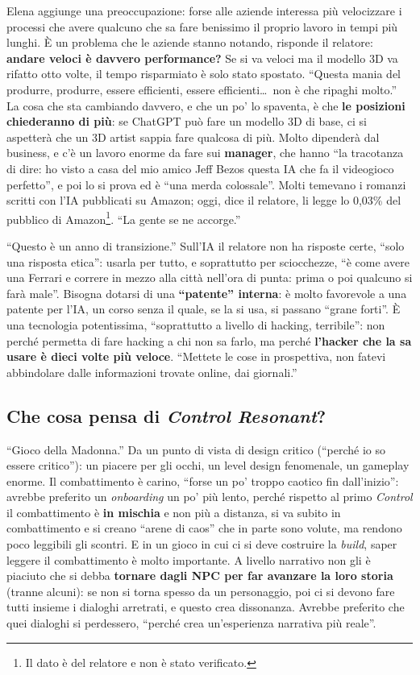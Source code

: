 Elena aggiunge una preoccupazione: forse alle aziende interessa più
velocizzare i processi che avere qualcuno che sa fare benissimo il proprio
lavoro in tempi più lunghi. È un problema che le aziende stanno notando,
risponde il relatore: \textbf{andare veloci è davvero performance?} Se si va
veloci ma il modello 3D va rifatto otto volte, il tempo risparmiato è solo
stato spostato. ``Questa mania del produrre, produrre, essere efficienti,
essere efficienti\ldots\ non è che ripaghi molto.'' La cosa che sta cambiando
davvero, e che un po' lo spaventa, è che \textbf{le posizioni chiederanno di
più}: se ChatGPT può fare un modello 3D di base, ci si aspetterà che un 3D
artist sappia fare qualcosa di più. Molto dipenderà dal business, e c'è un
lavoro enorme da fare sui \textbf{manager}, che hanno ``la tracotanza di dire:
ho visto a casa del mio amico Jeff Bezos questa IA che fa il videogioco
perfetto'', e poi lo si prova ed è ``una merda colossale''. Molti temevano i
romanzi scritti con l'IA pubblicati su Amazon; oggi, dice il relatore, li
legge lo 0,03\% del pubblico di Amazon\footnote{Il dato è del relatore e non è
stato verificato.}. ``La gente se ne accorge.''

``Questo è un anno di transizione.'' Sull'IA il relatore non ha risposte
certe, ``solo una risposta etica'': usarla per tutto, e soprattutto per
sciocchezze, ``è come avere una Ferrari e correre in mezzo alla città
nell'ora di punta: prima o poi qualcuno si farà male''. Bisogna dotarsi di una
\textbf{``patente'' interna}: è molto favorevole a una patente per l'IA, un
corso senza il quale, se la si usa, si passano ``grane forti''. È una
tecnologia potentissima, ``soprattutto a livello di hacking, terribile'': non
perché permetta di fare hacking a chi non sa farlo, ma perché \textbf{l'hacker
che la sa usare è dieci volte più veloce}. ``Mettete le cose in prospettiva,
non fatevi abbindolare dalle informazioni trovate online, dai giornali.''

\subsection{Che cosa pensa di \emph{Control Resonant}?}

``Gioco della Madonna.'' Da un punto di vista di design critico (``perché io
so essere critico''): un piacere per gli occhi, un level design fenomenale,
un gameplay enorme. Il combattimento è carino, ``forse un po' troppo caotico
fin dall'inizio'': avrebbe preferito un \emph{onboarding} un po' più lento,
perché rispetto al primo \emph{Control} il combattimento è \textbf{in mischia}
e non più a distanza, si va subito in combattimento e si creano ``arene di
caos'' che in parte sono volute, ma rendono poco leggibili gli scontri. E in
un gioco in cui ci si deve costruire la \emph{build}, saper leggere il
combattimento è molto importante. A livello narrativo non gli è piaciuto che
si debba \textbf{tornare dagli NPC per far avanzare la loro storia} (tranne
alcuni): se non si torna spesso da un personaggio, poi ci si devono fare
tutti insieme i dialoghi arretrati, e questo crea dissonanza. Avrebbe
preferito che quei dialoghi si perdessero, ``perché crea un'esperienza
narrativa più reale''.

